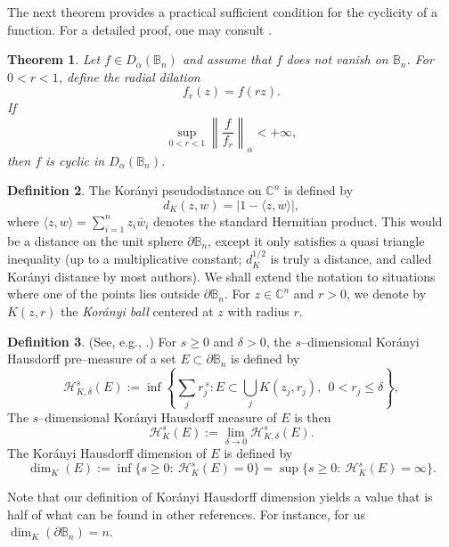 \documentclass[a4paper,12pt]{amsart}
\newtheorem{thm}{Theorem}
\theoremstyle{definition}
\newtheorem{defn}[thm]{Definition}
\theoremstyle{remark}
\def\Bn{\mathbb{B}_n}
\begin{document}
The next theorem provides a practical sufficient condition for the cyclicity of a function. For a detailed proof, one may consult \cite{Knese2019_Aniso_Bidisk}.

\begin{thm} \label{Radial_Dilation}
    Let $f \in D_{\alpha}(\Bn)$ and assume that $f$ does not vanish on $\Bn$. For $0 < r < 1$, define the radial dilation
    \begin{equation*}
        f_r (z) = f(rz).
    \end{equation*}
    If
    \begin{equation*}
        \sup_{0 < r < 1} \left\| \frac{f}{f_r} \right\|_{\alpha} < +\infty,
    \end{equation*}
    then $f$ is cyclic in $D_{\alpha}(\Bn)$.
\end{thm}

\begin{defn} \label{Korany_distance}
The Korányi pseudodistance on $\mathbb{C}^n$ is
defined by
\[
    d_K(z, w) = |1 - \langle z, w \rangle|,
\]
where $\langle z, w \rangle = \sum_{i=1}^n z_i \bar{w}_i$ denotes the standard Hermitian product.
This would be a distance on the unit sphere $\partial\Bn$,
except it only satisfies a quasi triangle inequality 
(up to a multiplicative constant; $d_K^{1/2}$ is truly
a distance, and called Kor\'anyi distance by most authors).
We shall extend the notation to situations where one of the points lies outside $\partial\Bn$.
For $z \in \mathbb{C}^n$ and $r > 0$, we denote by $K(z, r)$ the \emph{Korányi ball}
centered at $z$ with radius $r$.
\end{defn}

\begin{defn} \label{Korany_dimension}
(See, e.g., \cite{Pansu2018}.)
For $s\ge 0$ and $\delta>0$, the $s$--dimensional Kor\'anyi Hausdorff pre--measure
of a set $E\subset \partial\mathbb B_n$ is defined by
\[
\mathcal H^{s}_{K,\delta}(E)
:=
\inf\left\{
\sum_{j} r_j^{\,s}
:
E\subset \bigcup_{j} K(z_j,r_j),
\ \ 0<r_j\le \delta
\right\},
\]
The $s$--dimensional Kor\'anyi Hausdorff measure of $E$ is then
\[
\mathcal H^{s}_{K}(E)
:=
\lim_{\delta\to 0}\mathcal H^{s}_{K,\delta}(E).
\]
The Kor\'anyi Hausdorff dimension of $E$ is defined by
\[
\dim_{K}(E)
:=
\inf\{s\ge 0:\ \mathcal H^{s}_{K}(E)=0\}
=
\sup\{s\ge 0:\ \mathcal H^{s}_{K}(E)=\infty\}.
\]
\end{defn}
Note that our definition of Kor\'anyi Hausdorff dimension yields
a value that is half of what can be found in other references. 
For instance, for us $\dim_{K}(\partial \mathbb B_n)=n$. 
\end{document}

